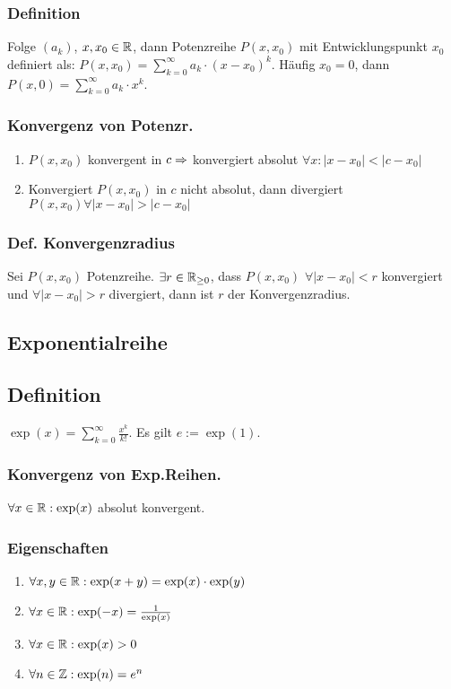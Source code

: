 \subsubsection*{Definition}
Folge $(a_k)$, $x, x_0 \in \mathbb R$, dann Potenzreihe $P(x, x_0)$ mit Entwicklungspunkt $x_0$ definiert als: $P(x, x_0) = \sum\limits_{k = 0}^\infty a_k \cdot (x - x_0)^k$. Häufig $x_0 = 0$, dann $P(x, 0) = \sum\limits_{k = 0}^\infty a_k \cdot x^k$.
\subsubsection*{Konvergenz von Potenzr.}
\begin{enumerate}[label=\alph*., noitemsep]
    \item $P(x, x_0)$ konvergent in $c \Rightarrow$ konvergiert absolut $\forall x: |x - x_0| < |c - x_0|$
    \item Konvergiert $P(x, x_0)$ in $c$ nicht absolut, dann divergiert $P(x, x_0) \forall |x - x_0| > |c - x_0|$
\end{enumerate}
\subsubsection*{Def. Konvergenzradius}
Sei $P(x, x_0)$ Potenzreihe. $\exists r \in \mathbb R_{\geq 0}$, dass $P(x, x_0)$ $\forall |x- x_0| < r$ konvergiert und $\forall |x - x_0| > r$ divergiert, dann ist $r$ der Konvergenzradius.
\subsection*{Exponentialreihe}
\subsection*{Definition}
$\exp(x) = \sum\limits_{k = 0}^\infty \frac{x^k}{k!}$. Es gilt $e := \exp(1)$.
\subsubsection*{Konvergenz von Exp.Reihen.}
$\forall x \in \mathbb R: \exp(x)$ absolut konvergent.
\subsubsection*{Eigenschaften}
\begin{enumerate}[label=\alph*., noitemsep]
    \item $\forall x, y \in \mathbb R: \exp(x + y) = \exp(x) \cdot \exp(y)$
    \item $\forall x \in \mathbb R: \exp(-x) = \frac{1}{\exp (x)}$
    \item $\forall x \in \mathbb R: \exp(x) > 0$
    \item $\forall n \in \mathbb Z: \exp(n) = e^{n}$ 
\end{enumerate}

